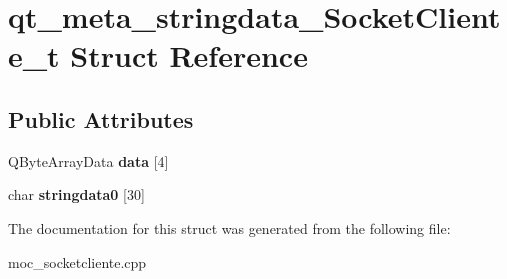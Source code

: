 \hypertarget{structqt__meta__stringdata__SocketCliente__t}{}\section{qt\+\_\+meta\+\_\+stringdata\+\_\+\+Socket\+Cliente\+\_\+t Struct Reference}
\label{structqt__meta__stringdata__SocketCliente__t}
\subsection*{Public Attributes}
\begin{DoxyCompactItemize}
\item 
\mbox{\label{structqt__meta__stringdata__SocketCliente__t_a2867440533e2fff6426e112601bb298b}} 
Q\+Byte\+Array\+Data {\bfseries data} \mbox{[}4\mbox{]}
\item 
\mbox{\label{structqt__meta__stringdata__SocketCliente__t_ab9d71094a159819d5e161e6cdce9311d}} 
char {\bfseries stringdata0} \mbox{[}30\mbox{]}
\end{DoxyCompactItemize}


The documentation for this struct was generated from the following file\+:\begin{DoxyCompactItemize}
\item 
moc\+\_\+socketcliente.\+cpp\end{DoxyCompactItemize}
